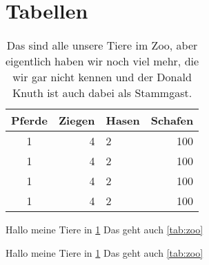 \section{Tabellen}

\begin{table}[t!] 
    \begin{center}
        \begin{tabular}{c|r|l|r}
            Pferde & Ziegen & Hasen & Schafen \\\hline\hline
            1 & 4 & 2 & 100 \\
            1 & 4 & 2 & 100 \\
            1 & 4 & 2 & 100 \\
            1 & 4 & 2 & 100 \\\hline
        \end{tabular}
    \caption[Tiere im Zoo. So.]{Das sind alle unsere Tiere im Zoo, aber eigentlich haben wir noch viel mehr, die wir gar nicht kennen und der Donald Knuth ist auch dabei als Stammgast.}
    \label{tab:zoo}
    \end{center}
\end{table}


Hallo meine Tiere in \ref{tab:zoo}
Das geht auch \vref{tab:zoo}
\clearpage

Hallo meine Tiere in \ref{tab:zoo}
Das geht auch \vref{tab:zoo}
\clearpage
\listoftables
